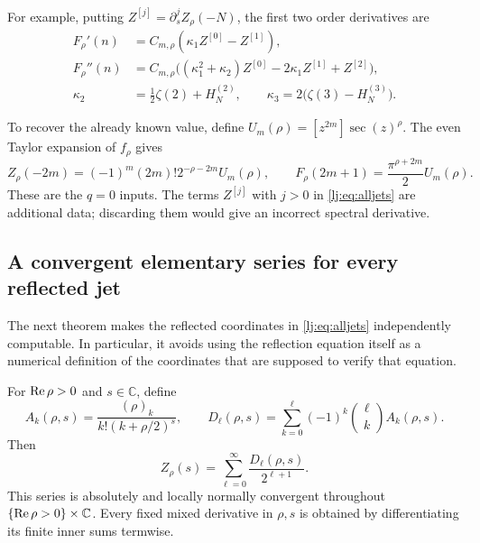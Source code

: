 For example, putting $Z^{[j]}=\partial_s^jZ_\rho(-N)$, the first two
order derivatives are
\begin{align}
 F_\rho'(n)&=C_{m,\rho}(\kappa_1Z^{[0]}-Z^{[1]}),
 \label{lj:eq:first}\\
 F_\rho''(n)&=C_{m,\rho}
       \bigl((\kappa_1^2+\kappa_2)Z^{[0]}
                      -2\kappa_1Z^{[1]}+Z^{[2]}\bigr),
 \label{lj:eq:second}\\
 \kappa_2&=\tfrac12\zeta(2)+H_N^{(2)},\qquad
 \kappa_3=2\bigl(\zeta(3)-H_N^{(3)}\bigr).\nonumber
\end{align}

To recover the already known value, define
$U_m(\rho)=[z^{2m}]\sec(z)^\rho$. The even Taylor expansion of
$f_\rho$ gives
\begin{equation}
 Z_\rho(-2m)=(-1)^m(2m)!2^{-\rho-2m}U_m(\rho),
 \qquad
 F_\rho(2m+1)=\frac{\pi^{\rho+2m}}2U_m(\rho).
 \label{lj:eq:valuecheck}
\end{equation}
These are the $q=0$ inputs. The terms $Z^{[j]}$ with $j>0$ in
\eqref{lj:eq:alljets} are additional data; discarding them would give
an incorrect spectral derivative.

\subsection{A convergent elementary series for every reflected jet}

The next theorem makes the reflected coordinates in
\eqref{lj:eq:alljets} independently computable. In particular, it avoids
using the reflection equation itself as a numerical definition of the
coordinates that are supposed to verify that equation.

\begin{theorem}
\label{lj:thm:Euler}
For $\operatorname{Re}\rho>0$ and $s\in\mathbb C$, define
\begin{equation}
 A_k(\rho,s)=\frac{(\rho)_k}{k!(k+\rho/2)^s},\qquad
 D_\ell(\rho,s)=\sum_{k=0}^\ell(-1)^k\binom\ell k A_k(\rho,s).
 \label{lj:eq:D}
\end{equation}
Then
\begin{equation}
 \boxed{\displaystyle
 Z_\rho(s)=\sum_{\ell=0}^\infty\frac{D_\ell(\rho,s)}{2^{\ell+1}}.}
 \label{lj:eq:Euler}
\end{equation}
This series is absolutely and locally normally convergent throughout
$\{\operatorname{Re}\rho>0\}\times\mathbb C$. Every fixed mixed derivative in
$\rho,s$ is obtained by differentiating its finite inner sums termwise.
\end{theorem}

